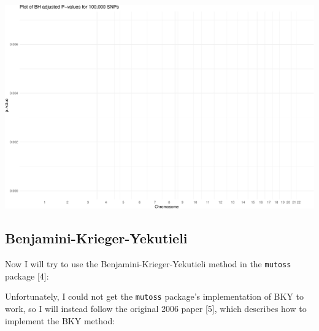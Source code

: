 \documentclass[
  12pt,
]{article}
\newenvironment{Shaded}{\begin{snugshade}}{\end{snugshade}}
\newcommand{\AttributeTok}[1]{\textcolor[rgb]{0.13,0.29,0.53}{#1}}
\newcommand{\FloatTok}[1]{\textcolor[rgb]{0.00,0.00,0.81}{#1}}
\newcommand{\FunctionTok}[1]{\textcolor[rgb]{0.13,0.29,0.53}{\textbf{#1}}}
\newcommand{\NormalTok}[1]{#1}
\newcommand{\OtherTok}[1]{\textcolor[rgb]{0.56,0.35,0.01}{#1}}
\newcommand{\SpecialCharTok}[1]{\textcolor[rgb]{0.81,0.36,0.00}{\textbf{#1}}}
\newcommand{\StringTok}[1]{\textcolor[rgb]{0.31,0.60,0.02}{#1}}
\begin{document}
\includegraphics{Arkesh_Das_CMSE_410_Semester_Project_files/figure-latex/BH plot test-1.pdf}

\subsection{Benjamini-Krieger-Yekutieli}\label{benjamini-krieger-yekutieli}

Now I will try to use the Benjamini-Krieger-Yekutieli method in the
\texttt{mutoss} package {[}4{]}:

\begin{Shaded}
\end{Shaded}

Unfortunately, I could not get the \texttt{mutoss} package's
implementation of BKY to work, so I will instead follow the original
2006 paper {[}5{]}, which describes how to implement the BKY method:
\end{document}
